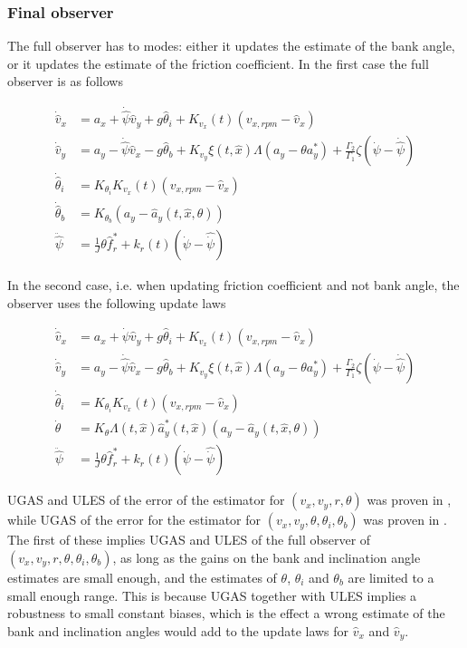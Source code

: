 \subsubsection{Final observer}
The full observer has to modes: either it updates the estimate of the bank angle, or it updates the estimate of the friction coefficient. In the first case the full observer is as follows

\begin{align}
    \dot{\hat{v}}_x & = a_x + \dot{\hat{\psi}}\hat{v}_y + g\hat{\theta}_i + K_{v_x}(t)(v_{x,rpm} - \hat{v}_x) \\
    \dot{\hat{v}}_y & = a_y - \dot{\hat{\psi}}\hat{v}_x - g\hat{\theta}_b + K_{v_y}\xi(t,\hat{x})\Lambda(a_y - \theta a_y^{*}) + \frac{\Gamma_2}{\Gamma_1}\zeta(\dot{\psi} - \dot{\hat{\psi}}) \\ 
    \dot{\hat{\theta}}_i & = K_{\theta_i}K_{v_x}(t)(v_{x,rpm} - \hat{v}_x) \\
    \dot{\hat{\theta}}_b & = K_{\theta_b}(a_y-\hat{a}_y(t,\hat{x},\theta)) \\ 
    \ddot{\hat{\psi}} & = \frac{1}{J}\theta \hat{f}_r^* + k_r(t)(\dot{\psi}-\hat{\dot{\psi}})
\end{align}

In the second case, i.e. when updating friction coefficient and not bank angle, the observer uses the following update laws

\begin{align}
    \dot{\hat{v}}_x & = a_x + \dot{\psi}\hat{v}_y + g\hat{\theta}_i + K_{v_x}(t)(v_{x,rpm} - \hat{v}_x) \\
    \dot{\hat{v}}_y & = a_y - \dot{\hat{\psi}}\hat{v}_x - g\hat{\theta}_b + K_{v_y}\xi(t,\hat{x})\Lambda(a_y - \theta a_y^{*}) + \frac{\Gamma_2}{\Gamma_1}\zeta(\dot{\psi} - \dot{\hat{\psi}}) \\ 
    \dot{\hat{\theta}}_i & = K_{\theta_i}K_{v_x}(t)(v_{x,rpm} - \hat{v}_x) \\
    \dot{\theta} & = K_{\theta}\Lambda (t, \hat{x})\hat{a}_y^*(t,\hat{x})(a_y - \hat{a}_y(t,\hat{x},\theta)) \\ 
    \ddot{\hat{\psi}} & = \frac{1}{J}\theta \hat{f}_r^* + k_r(t)(\dot{\psi}-\hat{\dot{\psi}})
\end{align}

\gls{UGAS} and \gls{ULES} of the error of the estimator for $(v_x,v_y,r,\theta)$ was proven in \cite{Automatica08}, while \gls{UGAS} of the error for the estimator for $(v_x,v_y,\theta, \theta_i, \theta_b)$ was proven in \cite{MainStateEst}. The first of these implies \gls{UGAS} and \gls{ULES} of the full observer of $(v_x,v_y, r,\theta, \theta_i, \theta_b)$, as long as the gains on the bank and inclination angle estimates are small enough, and the estimates of $\theta$, $\theta_i$ and $\theta_b$ are limited to a small enough range. This is because \gls{UGAS} together with \gls{ULES} implies a robustness to small constant biases, which is the effect a wrong estimate of the bank and inclination angles would add to the update laws for $\hat{v}_x$ and $\hat{v}_y$. 
